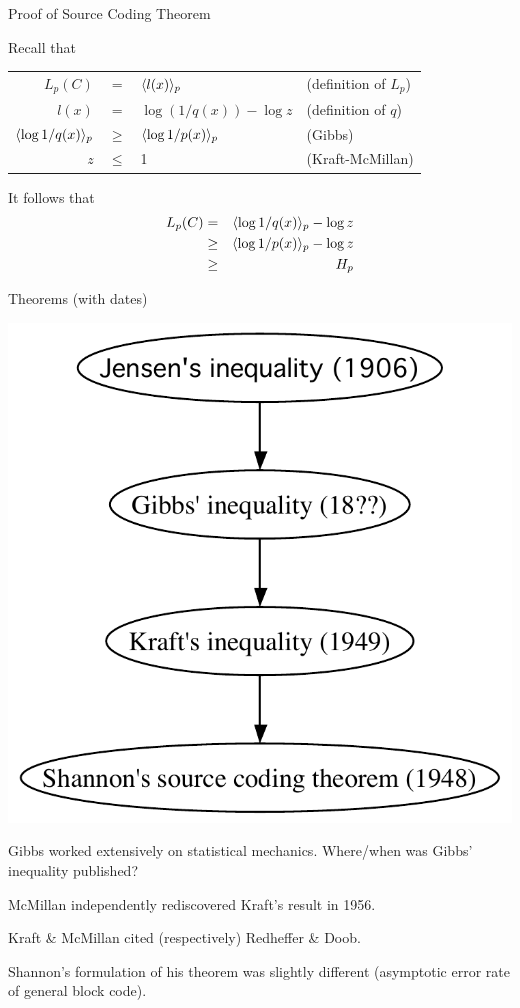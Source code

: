 \documentclass{beamer}
\begin{document}
\begin{frame}{Proof of Source Coding Theorem}

\itemb
\item Recall that
\begin{tabular}{rcll}
$L_p(C)$ & = & $\langle l(x) \rangle_p$ & (definition of $L_p$) \\
$l(x)$ & = & $\log(1/q(x)) - \log z$ & (definition of $q$) \\
$\langle \log 1/q(x) \rangle_p$ & $\geq$ & $\langle \log 1/p(x) \rangle_p$ & (Gibbs) \\
$z$ & $\leq$ & 1 & (Kraft-McMillan)
\end{tabular}
\item It follows that
\begin{eqnarray*}
L_p(C) & = & \langle \log 1/q(x) \rangle_p - \log z \\
& \geq & \langle \log 1/p(x) \rangle_p - \log z \\
& \geq & H_p
\end{eqnarray*}
\iteme

\end{frame}

\begin{frame}{Theorems (with dates)}

 \centerline{ \includegraphics[height=.5\textheight]{theorems-dates.pdf} }

\itemb
\item Gibbs worked extensively on statistical mechanics. \alert{Where/when was Gibbs' inequality published?}
\item McMillan independently rediscovered Kraft's result in 1956.
\item Kraft \& McMillan cited (respectively) Redheffer \& Doob.
\item Shannon's formulation of his theorem was slightly different (asymptotic error rate of general block code).
\iteme

\end{frame}
\end{document}
